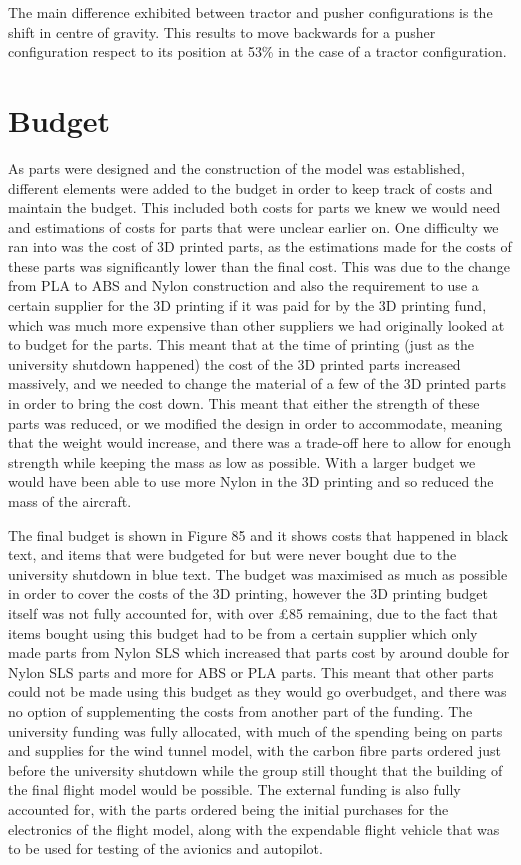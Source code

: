 \documentclass[../../main.tex]{subfiles}
\begin{document}
The main difference exhibited between tractor and pusher configurations is the shift in centre of gravity.
This results to move backwards for a pusher configuration respect to its position at 53\% in the case of a tractor configuration.

\section{Budget} \label{sec:project-review:budget}

As parts were designed and the construction of the model was established, different elements were added to the budget in order to keep track of costs and maintain the budget.
This included both costs for parts we knew we would need and estimations of costs for parts that were unclear earlier on.
One difficulty we ran into was the cost of 3D printed parts, as the estimations made for the costs of these parts was significantly lower than the final cost.
This was due to the change from PLA to ABS and Nylon construction and also the requirement to use a certain supplier for the 3D printing if it was paid for by the 3D printing fund, which was much more expensive than other suppliers we had originally looked at to budget for the parts.
This meant that at the time of printing (just as the university shutdown happened) the cost  of the 3D printed parts increased massively, and we needed to change the material of a few of the 3D printed parts in order to bring the cost down.
This meant that either the strength of these parts was reduced, or we modified the design in order to accommodate, meaning that the weight would increase, and there was a trade-off here to allow for enough strength while keeping the mass as low as possible.
With a larger budget we would have been able to use more Nylon in the 3D printing and so reduced the mass of the aircraft. 


The final budget is shown in Figure 85 and it shows costs that happened in black text, and items that were budgeted for but were never bought due to the university shutdown in blue text.
The budget was maximised as much as possible in order to cover the costs of the 3D printing, however the 3D printing budget itself was not fully accounted for, with over £85 remaining, due to the fact that items bought using this budget had to be from a certain supplier which only made parts from Nylon SLS which increased that parts cost by around double for Nylon SLS parts and more for ABS or PLA parts.
This meant that other parts could not be made using this budget as they would go overbudget, and there was no option of supplementing the costs from another part of the funding.
The university funding was fully allocated, with much of the spending being on parts and supplies for the wind tunnel model, with the carbon fibre parts ordered just before the university shutdown while the group still thought that the building of the final flight model would be possible.
The external funding is also fully accounted for, with the parts ordered being the initial purchases for the electronics of the flight model, along with the expendable flight vehicle that was to be used for testing of the avionics and autopilot. 
\end{document}
